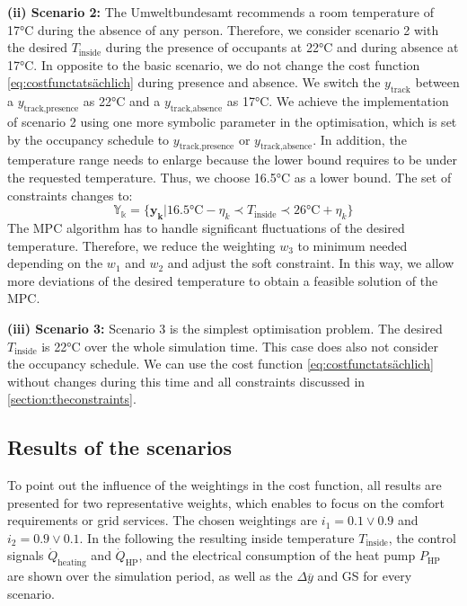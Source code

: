 \textbf{(ii) Scenario 2:}\newline
The Umweltbundesamt \cite{Umweltbundesamt.7.10.2021} recommends a room temperature of 17°C during the absence of any person. Therefore, we consider scenario 2 with the desired $T_\text{inside}$ during the presence of occupants at 22°C and during absence at 17°C. In opposite to the basic scenario, we do not change the cost function \ref{eq:costfunctatsächlich} during presence and absence. We switch the $y_\text{track}$ between a $y_\text{track,presence}$ as 22°C and a $y_\text{track,absence}$ as 17°C. We achieve the implementation of scenario 2 using one more symbolic parameter in the optimisation, which is set by the occupancy schedule to $y_\text{track,presence}$ or $y_\text{track,absence}$. In addition, the temperature range needs to enlarge because the lower bound requires to be under the requested temperature. Thus, we choose 16.5°C as a lower bound. The set of constraints changes to:
\begin{equation}
    \label{ConstraintYScenario2}
    \mathbb{Y_k} = \{\mathbf{y_k}| 16.5 \text{°C} - \eta_k \prec T_\text{inside} \prec 26 \text{°C}+ \eta_k\} 
\end{equation}
The MPC algorithm has to handle significant fluctuations of the desired temperature. Therefore, we reduce the weighting $w_\text{3}$ to minimum needed depending on the $w_\text{1}$ and $w_\text{2}$ and adjust the soft constraint. In this way, we allow more deviations of the desired temperature to obtain a feasible solution of the MPC. \newline 

\textbf{(iii) Scenario 3:}\newline
Scenario 3 is the simplest optimisation problem. The desired $T_\text{inside}$ is 22°C over the whole simulation time. This case does also not consider the occupancy schedule. We can use the cost function \ref{eq:costfunctatsächlich} without changes during this time and all constraints discussed in \autoref{section:theconstraints}.

    \begin{figure}[H]
           \centering
        \def\svgwidth{1\textwidth}
        
        \caption{}
         \label{fig:Solltemperaturverlauf}
    \end{figure}

\subsection{Results of the scenarios}
\label{subsec:Results of the scenarios}
To point out the influence of the weightings in the cost function, all results are presented for two representative weights, which enables to focus on the comfort requirements or grid services. The chosen weightings are $i_\text{1} = 0.1 \vee 0.9$ and $i_\text{2} = 0.9 \vee 0.1$. In the following the resulting inside temperature $T_\text{inside}$, the control signals  $\dot{Q}_\text{heating}$ and $\dot{Q}_\text{HP}$, and the electrical consumption of the heat pump $P_\text{HP}$ are shown over the simulation period, as well as the $\Delta \overline{y}$ and GS for every scenario.\newline

